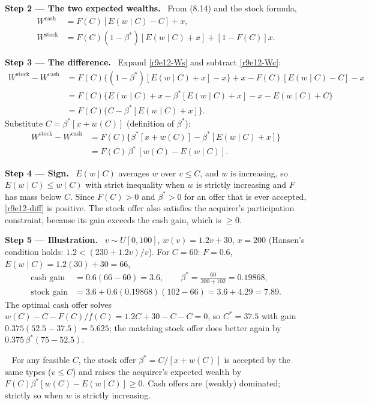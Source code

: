 \documentclass[11pt,a4paper]{article}
\newcommand{\step}[2]{\par\medskip\noindent\textbf{Step #1 --- #2.}~}
\newcommand{\answer}[1]{\par\smallskip\noindent\fbox{\textbf{Answer #1.}}~}
\begin{document}
\step{2}{The two expected wealths} From (8.14) and the stock formula,
\begin{align}
  W^{\text{cash}} &= F(C)[E(w\mid C)-C]+x, \label{r9e12-Wc}\\
  W^{\text{stock}} &= F(C)(1-\beta^*)[E(w\mid C)+x]+[1-F(C)]x. \label{r9e12-Ws}
\end{align}

\step{3}{The difference} Expand \eqref{r9e12-Ws} and subtract \eqref{r9e12-Wc}:
\begin{align}
  W^{\text{stock}}-W^{\text{cash}} &= F(C)\{(1-\beta^*)[E(w\mid C)+x]-x\}+x-F(C)[E(w\mid C)-C]-x \nonumber\\
  &= F(C)\{E(w\mid C)+x-\beta^*[E(w\mid C)+x]-x-E(w\mid C)+C\} \nonumber\\
  &= F(C)\{C-\beta^*[E(w\mid C)+x]\}. \nonumber
\end{align}
Substitute $C=\beta^*[x+w(C)]$ (definition of $\beta^*$):
\begin{align}
  W^{\text{stock}}-W^{\text{cash}} &= F(C)\{\beta^*[x+w(C)]-\beta^*[E(w\mid C)+x]\} \nonumber\\
  &= F(C)\,\beta^*\,[w(C)-E(w\mid C)]. \label{r9e12-diff}
\end{align}

\step{4}{Sign} $E(w\mid C)$ averages $w$ over $v\le C$, and $w$ is increasing, so $E(w\mid C)\le w(C)$ with
strict inequality when $w$ is strictly increasing and $F$ has mass below $C$. Since $F(C)>0$ and
$\beta^*>0$ for an offer that is ever accepted, \eqref{r9e12-diff} is positive. The stock offer also
satisfies the acquirer's participation constraint, because its gain exceeds the cash gain, which is $\ge 0$.

\step{5}{Illustration} $v\sim U[0,100]$, $w(v)=1.2v+30$, $x=200$ (Hansen's condition holds:
$1.2<(230+1.2v)/v$). For $C=60$: $F=0.6$, $E(w\mid C)=1.2(30)+30=66$,
\begin{align}
  \text{cash gain} &= 0.6(66-60)=3.6, \qquad \beta^*=\frac{60}{200+102}=0.19868, \nonumber\\
  \text{stock gain} &= 3.6+0.6(0.19868)(102-66)=3.6+4.29=7.89. \nonumber
\end{align}
The optimal cash offer solves $w(C)-C-F(C)/f(C)=1.2C+30-C-C=0$, so $C^*=37.5$ with gain
$0.375(52.5-37.5)=5.625$; the matching stock offer does better again by $0.375\,\beta^*(75-52.5)$.
\answer{(\#4)} For any feasible $C$, the stock offer $\beta^*=C/[x+w(C)]$ is accepted by the same types
($v\le C$) and raises the acquirer's expected wealth by $F(C)\beta^*[w(C)-E(w\mid C)]\ge 0$. Cash offers are
(weakly) dominated; strictly so when $w$ is strictly increasing.
\end{document}

